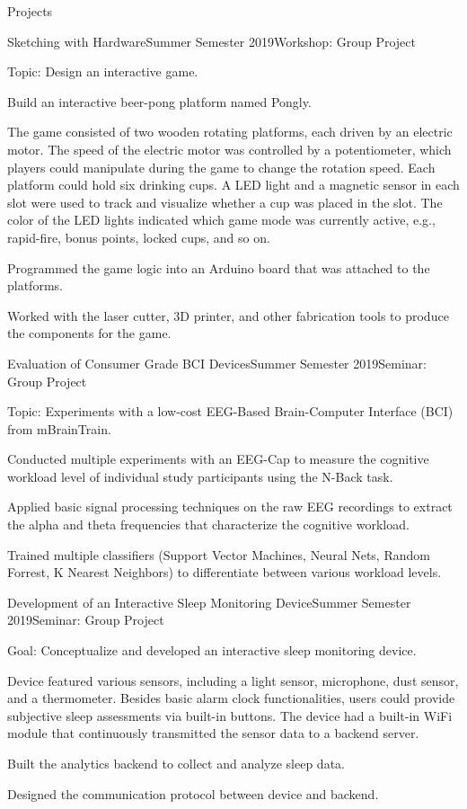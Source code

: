 \documentclass{resume} %
\begin{document}
\begin{rSection}{Projects}
\begin{rSubsection}{Sketching with Hardware}{Summer Semester 2019}{Workshop: Group Project}{}
\item Topic: Design an interactive game.
\item Build an interactive beer-pong platform named Pongly.
\item The game consisted of two wooden rotating platforms, each driven by an electric motor. The speed of the electric motor was controlled by a potentiometer, which players could manipulate during the game to change the rotation speed. Each platform could hold six drinking cups. A LED light and a magnetic sensor in each slot were used to track and visualize whether a cup was placed in the slot. The color of the LED lights indicated which game mode was currently active, e.g., rapid-fire, bonus points, locked cups, and so on.
\item Programmed the game logic into an Arduino board that was attached to the platforms.
\item Worked with the laser cutter, 3D printer, and other fabrication tools to produce the components for the game.
\end{rSubsection}

\begin{rSubsection}{Evaluation of Consumer Grade BCI Devices}{Summer Semester 2019}{Seminar: Group Project}{}
\item Topic: Experiments with a low-cost EEG-Based Brain-Computer Interface (BCI) from mBrainTrain.
\item Conducted multiple experiments with an EEG-Cap to measure the cognitive workload level of individual study participants using the N-Back task.
\item Applied basic signal processing techniques on the raw EEG recordings to extract the alpha and theta frequencies that characterize the cognitive workload.
\item Trained multiple classifiers (Support Vector Machines, Neural Nets, Random Forrest, K Nearest Neighbors) to differentiate between various workload levels.
\end{rSubsection}

\begin{rSubsection}{Development of an Interactive Sleep Monitoring Device}{Summer Semester 2019}{Seminar: Group Project}{}
\item Goal: Conceptualize and developed an interactive sleep monitoring device.
\item Device featured various sensors, including a light sensor, microphone, dust sensor, and a thermometer. Besides basic alarm clock functionalities, users could provide subjective sleep assessments via built-in buttons. The device had a built-in WiFi module that continuously transmitted the sensor data to a backend server.
\item Built the analytics backend to collect and analyze sleep data.
\item Designed the communication protocol between device and backend.
\end{rSubsection}


\end{rSection}
\end{document}
